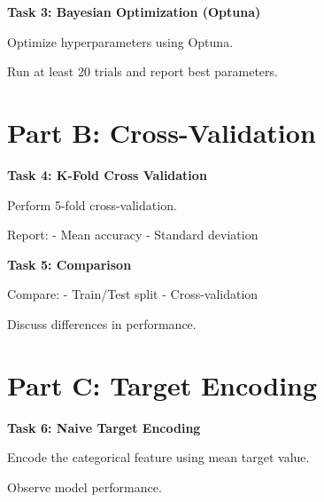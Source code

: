 \documentclass[12pt,a4paper]{article}
\begin{document}
\vspace{6pt}

\begin{tcolorbox}
\textbf{Task 3: Bayesian Optimization (Optuna)}

Optimize hyperparameters using Optuna.

Run at least 20 trials and report best parameters.

\vspace{2cm}

\vspace{2cm}
\end{tcolorbox}


\section*{Part B: Cross-Validation}

\begin{tcolorbox}
\textbf{Task 4: K-Fold Cross Validation}

Perform 5-fold cross-validation.

Report:
- Mean accuracy  
- Standard deviation  

\vspace{2cm}

\vspace{2cm}
\end{tcolorbox}

\vspace{6pt}

\begin{tcolorbox}
\textbf{Task 5: Comparison}

Compare:
- Train/Test split  
- Cross-validation  

Discuss differences in performance.

\vspace{2cm}

\vspace{2cm}
\end{tcolorbox}


\section*{Part C: Target Encoding}

\begin{tcolorbox}
\textbf{Task 6: Naive Target Encoding}

Encode the categorical feature using mean target value.

Observe model performance.

\vspace{2cm}

\vspace{2cm}
\end{tcolorbox}
\end{document}
